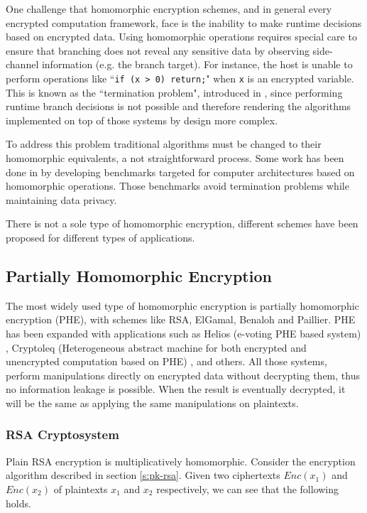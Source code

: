 One challenge that homomorphic encryption schemes, and in general every encrypted computation framework, face is the inability to make runtime decisions based on encrypted data.
Using homomorphic operations requires special care to ensure that branching does not reveal any sensitive data by observing side-channel information (e.g. the branch target).
For instance, the host is unable to perform operations like ``\texttt{if (x > 0) return;}" when \texttt{x} is an encrypted variable.
This is known as the ``termination problem", introduced in \cite{brenner2011secret}, since performing runtime branch decisions is not possible and therefore rendering the algorithms implemented on top of those systems by design more complex.


To address this problem traditional algorithms must be changed to their homomorphic equivalents, a not straightforward process.
Some work has been done in \cite{mouris2018terminator} by developing benchmarks targeted for computer architectures based on homomorphic operations.
Those benchmarks avoid termination problems while maintaining data privacy.


There is not a sole type of homomorphic encryption, different schemes have been proposed for different types of applications.


\subsection{Partially Homomorphic Encryption}\label{ss:phe}
The most widely used type of homomorphic encryption is partially homomorphic encryption (PHE), with schemes like RSA, ElGamal, Benaloh and Paillier.
PHE has been expanded with applications such as Helios (e-voting PHE based system) \cite{adida2008helios}, Cryptoleq (Heterogeneous abstract machine for both encrypted and unencrypted computation based on PHE) \cite{mazonka2016cryptoleq}, and others.
All those systems, perform manipulations directly on encrypted data without decrypting them, thus no information leakage is possible.
When the result is eventually decrypted, it will be the same as applying the same manipulations on plaintexts.

\subsubsection{RSA Cryptosystem}\label{ss:rsa}
Plain RSA encryption is multiplicatively homomorphic. Consider the encryption algorithm described in section \ref{s:pk-rsa}. Given two ciphertexts $Enc(x_1)$ and $Enc(x_2)$ of plaintexts $x_1$ and $x_2$ respectively, we can see that the following holds.

